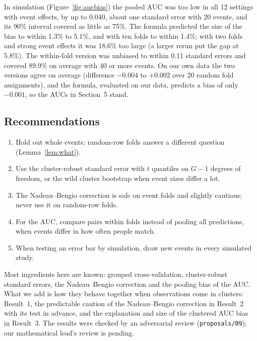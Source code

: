 In simulation (Figure~\ref{fig:aucbias}) the pooled AUC was too low in all 12 settings with event effects, by up to
0.040, about one standard error with 20 events, and its 90\% interval covered as little as 75\%. The formula predicted
the size of the bias to within 1.3\% to 5.1\%, and with ten folds to within 1.4\%; with two folds and strong event
effects it was 18.6\% too large (a larger rerun put the gap at 5.8\%). The
within-fold version was unbiased to within 0.11 standard errors and covered 89.9\% on average with 40 or more events.
On our own data the two versions agree on average (difference $-0.004$ to $+0.002$ over 20 random fold assignments),
and the formula, evaluated on our data, predicts a bias of only $-0.001$, so the AUCs in Section~5 stand.

\subsection{Recommendations}

\begin{enumerate}
\item Hold out whole events; random-row folds answer a different question (Lemma~\ref{lem:what}).
\item Use the cluster-robust standard error with $t$ quantiles on $G-1$ degrees of freedom, or the wild cluster
bootstrap when event sizes differ a lot.
\item The Nadeau--Bengio correction is safe on event folds and slightly cautious; never use it on random-row folds.
\item For the AUC, compare pairs within folds instead of pooling all predictions, when events differ in how often
people match.
\item When testing an error bar by simulation, draw new events in every simulated study.
\end{enumerate}

Most ingredients here are known: grouped cross-validation, cluster-robust standard errors, the Nadeau--Bengio
correction and the pooling bias of the AUC. What we add is how they behave together when observations come in
clusters: Result~1, the predictable caution of the Nadeau--Bengio correction in Result~2 with its test in advance, and the
explanation and size of the clustered AUC bias in Result~3. The results were checked by an adversarial review
(\texttt{proposals/09}); our mathematical lead's review is pending.
